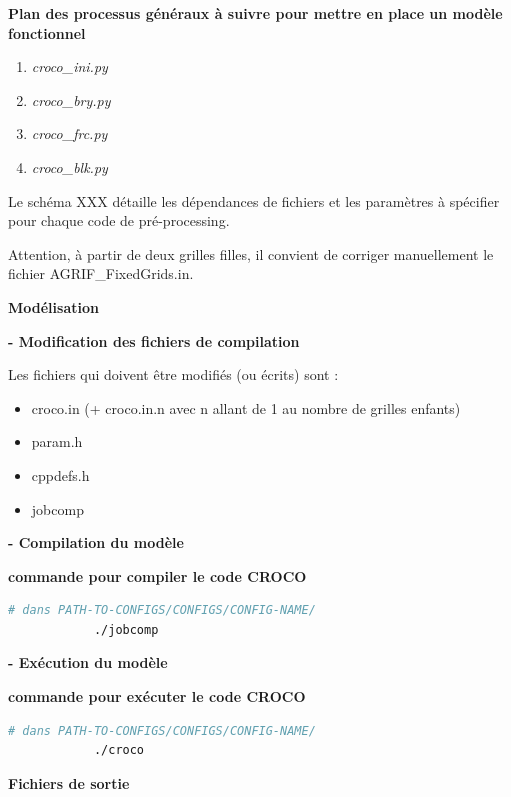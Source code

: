\documentclass[10pt,a4paper,titlepage]{article}
\begin{document}
\begin{processEnv}{\textbf{Plan des processus généraux à suivre pour mettre en place un modèle fonctionnel}}
    \begin{enumerate}
        \item \textit{croco\_ini.py}
        \item \textit{croco\_bry.py}
        \item \textit{croco\_frc.py}
        \item \textit{croco\_blk.py}
    \end{enumerate}

    Le schéma XXX détaille les dépendances de fichiers et les paramètres à spécifier pour chaque code de pré-processing.

    Attention, à partir de deux grilles filles, il convient de corriger manuellement le fichier AGRIF\_FixedGrids.in.

    {\color{workColor}\textbf{Modélisation}}

    \textbf{- Modification des fichiers de compilation}

    Les fichiers qui doivent être modifiés (ou écrits) sont :

    \begin{itemize}
        \item croco.in (+ croco.in.n avec n allant de 1 au nombre de grilles enfants)
        \item param.h
        \item cppdefs.h
        \item jobcomp
    \end{itemize}

    \textbf{- Compilation du modèle}

    \begin{codeEnv}{\textbf{commande pour compiler le code CROCO}}
        \begin{lstlisting}[language=bash]
            # dans PATH-TO-CONFIGS/CONFIGS/CONFIG-NAME/
            ./jobcomp
        \end{lstlisting}
    \end{codeEnv}

    \textbf{- Exécution du modèle}

    \begin{codeEnv}{\textbf{commande pour exécuter le code CROCO}}
        \begin{lstlisting}[language=bash]
            # dans PATH-TO-CONFIGS/CONFIGS/CONFIG-NAME/
            ./croco
        \end{lstlisting}
    \end{codeEnv}

    {\color{outputColor}\textbf{Fichiers de sortie}}


\end{processEnv}
\end{document}
